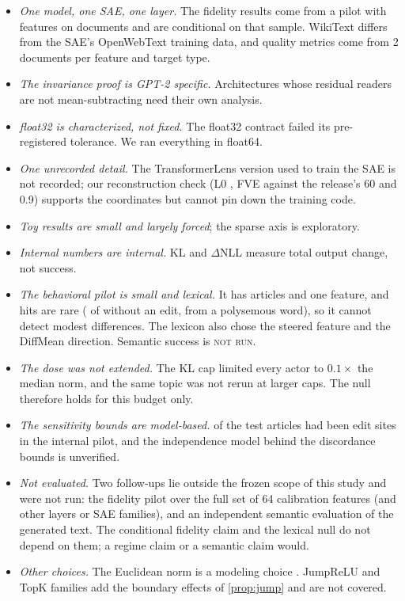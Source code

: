 \documentclass{article}
\theoremstyle{plain}
\theoremstyle{definition}
\theoremstyle{remark}
\newcommand{\notrun}{\textsc{not run}}
\begin{document}
\begin{itemize}
  \item \emph{One model, one SAE, one layer.} The fidelity results come from a pilot with
  \PilotFeatures{} features on \PilotDocs{} documents and are conditional on that sample.
  WikiText differs from the SAE's OpenWebText training data, and quality metrics come from 2
  documents per feature and target type.
  \item \emph{The invariance proof is GPT-2 specific.} Architectures whose residual readers
  are not mean-subtracting need their own analysis.
  \item \emph{float32 is characterized, not fixed.} The float32 contract failed its
  pre-registered tolerance. We ran everything in float64.
  \item \emph{One unrecorded detail.} The TransformerLens version used to train the SAE is
  not recorded; our reconstruction check (L0 \CxLZero, FVE \CxFVE{} against the release's 60
  and 0.9) supports the coordinates but cannot pin down the training code.
  \item \emph{Toy results are small and largely forced}; the sparse axis is exploratory.
  \item \emph{Internal numbers are internal.} KL and $\Delta$NLL measure total output change,
  not success.
  \item \emph{The behavioral pilot is small and lexical.} It has \SpDocs{} articles and one
  feature, and hits are rare (\SpBoth{} of \SpDocs{} without an edit, from a polysemous word),
  so it cannot detect modest differences. The lexicon also chose the steered feature and the
  DiffMean direction. Semantic success is \notrun.
  \item \emph{The dose was not extended.} The KL cap limited every actor to $0.1\times$ the
  median norm, and the same topic was not rerun at larger caps. The null therefore holds for
  this budget only.
  \item \emph{The sensitivity bounds are model-based.} \SpOverlapPilot{} of the \SpDocs{}
  test articles had been edit sites in the internal pilot, and the independence model behind
  the discordance bounds is unverified.
  \item \emph{Not evaluated.} Two follow-ups lie outside the frozen scope of this study and
  were not run: the fidelity pilot over the full set of 64 calibration features (and other
  layers or SAE families), and an independent semantic evaluation of the generated text. The
  conditional fidelity claim and the lexical null do not depend on them; a regime claim or a
  semantic claim would.
  \item \emph{Other choices.} The Euclidean norm is a modeling choice
  \citep{park2024linear}. JumpReLU and TopK families \citep{lieberum2024gemma} add the
  boundary effects of \cref{prop:jump} and are not covered.
\end{itemize}
\end{document}
